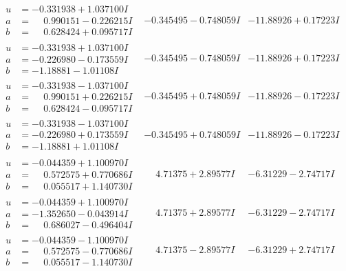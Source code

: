 \documentclass[1p]{elsarticle_modified}
\theoremstyle{definition}
\begin{document}
$$\begin{array}{c|c|c}
\begin{aligned}
u &= -0.331938 + 1.037100 I \\
a &= \phantom{-}0.990151 - 0.226215 I \\
b &= \phantom{-}0.628424 + 0.095717 I\end{aligned}
 & -0.345495 - 0.748059 I & -11.88926 + 0.17223 I \\ \hline\begin{aligned}
u &= -0.331938 + 1.037100 I \\
a &= -0.226980 - 0.173559 I \\
b &= -1.18881 - 1.01108 I\end{aligned}
 & -0.345495 - 0.748059 I & -11.88926 + 0.17223 I \\ \hline\begin{aligned}
u &= -0.331938 - 1.037100 I \\
a &= \phantom{-}0.990151 + 0.226215 I \\
b &= \phantom{-}0.628424 - 0.095717 I\end{aligned}
 & -0.345495 + 0.748059 I & -11.88926 - 0.17223 I \\ \hline\begin{aligned}
u &= -0.331938 - 1.037100 I \\
a &= -0.226980 + 0.173559 I \\
b &= -1.18881 + 1.01108 I\end{aligned}
 & -0.345495 + 0.748059 I & -11.88926 - 0.17223 I \\ \hline\begin{aligned}
u &= -0.044359 + 1.100970 I \\
a &= \phantom{-}0.572575 + 0.770686 I \\
b &= \phantom{-}0.055517 + 1.140730 I\end{aligned}
 & \phantom{-}4.71375 + 2.89577 I & -6.31229 - 2.74717 I \\ \hline\begin{aligned}
u &= -0.044359 + 1.100970 I \\
a &= -1.352650 - 0.043914 I \\
b &= \phantom{-}0.686027 - 0.496404 I\end{aligned}
 & \phantom{-}4.71375 + 2.89577 I & -6.31229 - 2.74717 I \\ \hline\begin{aligned}
u &= -0.044359 - 1.100970 I \\
a &= \phantom{-}0.572575 - 0.770686 I \\
b &= \phantom{-}0.055517 - 1.140730 I\end{aligned}
 & \phantom{-}4.71375 - 2.89577 I & -6.31229 + 2.74717 I \\ \hline\begin{aligned}

\end{aligned}
\end{array}$$
\end{document}
